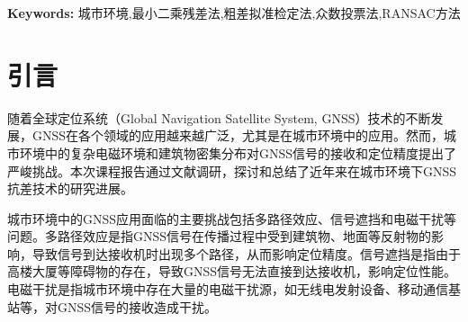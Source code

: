 \documentclass[12pt,hyperref,a4paper,UTF8]{ctexart}
\providecommand{\keywords}[1]
{
  \small	
  \textbf{Keywords:} #1
}
\begin{document}
\cover

\begin{abstract}
    全球导航卫星系统（GNSS）在城市环境中的应用面临着多路径效应、信号遮挡和电磁干扰等挑战，这些问题严重影响了GNSS的定位精度和可靠性。本课程报告综合回顾了城市环境下GNSS抗差技术的最新研究进展，特别关注了多路径效应的抑制方法、信号遮挡的解决方案以及抗干扰技术的发展。在众多抗差方法中，本报告重点介绍了四种常见技术：最小二乘残差法、粗差拟准检定法、众数投票法和RANSAC方法。最小二乘残差法通过统计假设检验来检测并剔除粗差；粗差拟准检定法通过解算秩亏方程组来识别和修正粗差；众数投票法利用已知的精确信息来发现单历元粗差；而RANSAC方法则是一种迭代方法，用于从包含异常值的数据中估计数学模型参数，特别适用于数据包含显著噪声或异常值时的鲁棒性拟合。尽管已有显著进展，但仍存在挑战，未来的研究需进一步探索多路径效应的精确建模、信号遮挡情况下的高精度定位技术以及抗干扰技术的优化。此外，随着人工智能和机器学习技术的发展，这些技术在GNSS抗差技术中的应用也显示出巨大潜力。本报告总结了当前的研究进展，并对未来的研究方向提出了展望。
\end{abstract}

\keywords{城市环境,最小二乘残差法,粗差拟准检定法,众数投票法,RANSAC方法}
\thispagestyle{empty} %

\newpage
\tableofcontents

\newpage



\section{引言}
随着全球定位系统（Global Navigation Satellite System, GNSS）技术的不断发展，GNSS在各个领域的应用越来越广泛，尤其是在城市环境中的应用。然而，城市环境中的复杂电磁环境和建筑物密集分布对GNSS信号的接收和定位精度提出了严峻挑战。本次课程报告通过文献调研，探讨和总结了近年来在城市环境下GNSS抗差技术的研究进展。

城市环境中的GNSS应用面临的主要挑战包括多路径效应、信号遮挡和电磁干扰等问题。多路径效应是指GNSS信号在传播过程中受到建筑物、地面等反射物的影响，导致信号到达接收机时出现多个路径，从而影响定位精度。信号遮挡是指由于高楼大厦等障碍物的存在，导致GNSS信号无法直接到达接收机，影响定位性能。电磁干扰是指城市环境中存在大量的电磁干扰源，如无线电发射设备、移动通信基站等，对GNSS信号的接收造成干扰。
\end{document}
